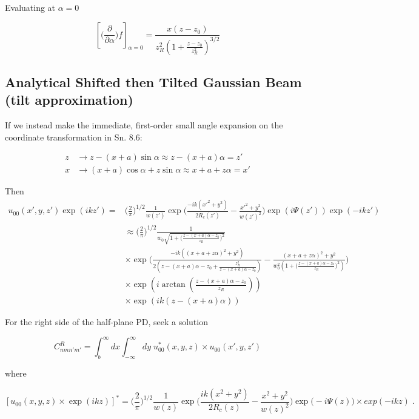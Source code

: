 \documentclass[aps,twoside,secnumarabic,balancelastpage,amsmath,amssymb,nofootinbib,hyperref=pdftex]{revtex4}
\newcommand{\bigfrac}[2]{\Big( \frac{#1}{#2}\Big)}
\begin{document}
Evaluating at $\alpha = 0$

\begin{equation}
    \left[
    \big( \frac{\partial}{\partial \alpha} \big) f
    \right]_{\alpha = 0}
    =
    \frac{x (z - z_0)}{z_R^2 (1+ \frac{z  - z_0}{z_R^2})^{3/2}}
\end{equation}

\subsection{Analytical Shifted then Tilted Gaussian Beam (tilt approximation)}

If we instead make the immediate, first-order small angle expansion on the coordinate transformation in Sn. 8.6:
 
 \begin{align*}
 	z &\rightarrow z-(x+a) \sin \alpha \approx z - (x+a) \alpha = z'
 	\\x &\rightarrow (x+a) \cos \alpha + z \sin \alpha \approx x+a + z \alpha = x'
 \end{align*}

 Then
	\begin{align*} 
		u_{00}(x',y,z') \exp(ikz')=&
			\bigfrac{2}{\pi}^{1/2}
			\frac{1}{w(z')}
			\exp \Big(\frac{-ik(x'^{2}+y^{2})}{2R_{c}(z')}-
			\frac{x'^{2}+y^{2}}{w(z')^{2}} \Big)
			\exp(i \Psi (z'))
			\exp(-ikz')
		\\& \approx
			\bigfrac{2}{\pi}^{1/2}
			\frac{1}{w_0 \sqrt{1+\bigfrac{z-(x+a)\alpha -z_0}{z_R}^2}}
			\\&
			\times
			\exp 
			\Big(
			\frac
			{
			-ik((x+a+z\alpha)^{2}		
			+y^{2})
			}
			{2( z-(x+a)\alpha  - z_0 + 
			\frac{z_R^2}{z-(x+a)\alpha -z_0 } ) }-
			\frac{(x+a+z\alpha)^{2}  +y^{2}}
			{
				w_0^2 (1+\bigfrac{z-(x+a)\alpha-z_0}{z_R}^2)
			}
			\Big)
			\\&
			\times \exp(
			i \arctan( \frac{z-(x+a)\alpha - z_0}{z_R}) )				
			\\&
			\times \exp(
			ik(z - (x+a)\alpha) )						
	\end{align*}

For the right side of the half-plane PD, seek a solution

\begin{equation*}
	C_{nmn'm'}^{R} = 
		\int_{b}^{\infty} dx\int_{-\infty}^{\infty}  dy \;
		u_{00}^* (x,y,z) \times u_{00}(x',y,z')
\end{equation*}

where

\begin{equation*}
\left[u_{00}(x,y,z)\times \exp(ikz)\right] ^*= 
			\bigfrac{2}{\pi}^{1/2}
			\frac{1}{w(z)}
			\exp \Big(\frac{ik(x^{2}+y^{2})}{2R_{c}(z)}-
			\frac{x^{2}+y^{2}}{w(z)^{2}} \Big) 
			\exp \Big( -i\Psi(z) \Big) \times exp(-ikz)
			\; .
\end{equation*}
\end{document}
